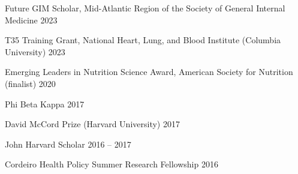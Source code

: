 \documentclass[11pt,article,oneside]{memoir}
\begin{document}
\ind Future GIM Scholar, Mid-Atlantic Region of the Society of General Internal Medicine \hfill 2023

\ind T35 Training Grant, National Heart, Lung, and Blood Institute (Columbia University) \hfill 2023

\ind Emerging Leaders in Nutrition Science Award, American Society for Nutrition (finalist) \hfill 2020

\ind Phi Beta Kappa \hfill 2017

\ind David McCord Prize (Harvard University) \hfill 2017

\ind John Harvard Scholar \hfill 2016 -- 2017

\ind Cordeiro Health Policy Summer Research Fellowship \hfill 2016

\bigskip
\end{document}
